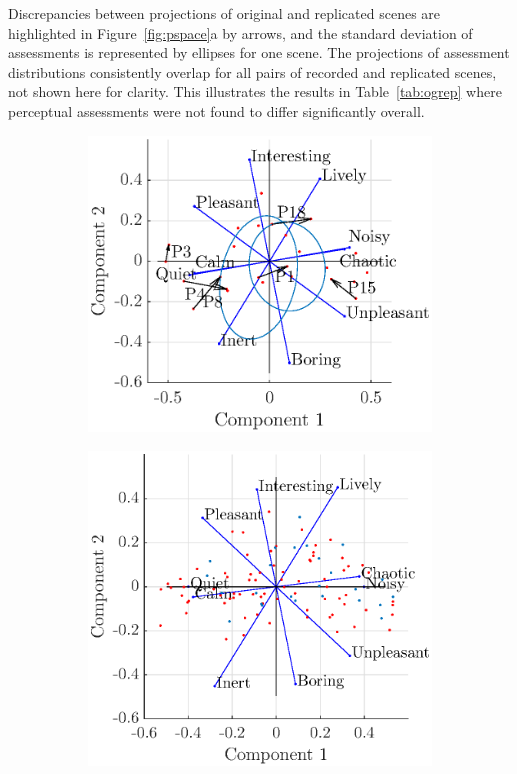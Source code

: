 \documentclass[11pt,a4paper]{article}
\begin{document}
Discrepancies between projections of original and replicated scenes are highlighted in Figure~\ref{fig:pspace}a by arrows, and the standard deviation of assessments is represented by ellipses for one scene. The projections of assessment distributions consistently overlap for all pairs of recorded and replicated scenes, not shown here for clarity. This illustrates the results in Table~\ref{tab:ogrep} where perceptual assessments were not found to differ significantly overall.\\

\begin{figure}[h]
    \centering
     \begin{subfigure}[t]{0.55\textwidth}
        \centering
        \includegraphics[width=\textwidth]{figures/pca_p1.eps}
    \end{subfigure}%
    \begin{subfigure}[t]{0.5\textwidth}
        \centering
        \includegraphics[width=\textwidth]{figures/pca_sim.eps}

\end{subfigure}
\end{figure}
\end{document}
